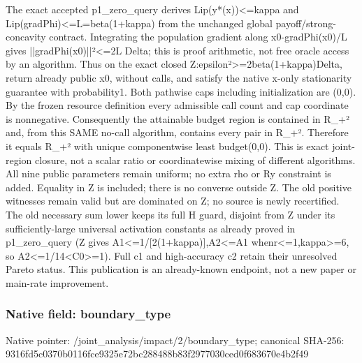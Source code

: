 \documentclass[10pt,a4paper]{article}
\begin{document}
\begingroup\raggedright\sloppy The exact accepted p1\_\allowbreak{}zero\_\allowbreak{}query derives Lip(y*(x))<=\allowbreak{}kappa and Lip(gradPhi)<=\allowbreak{}L=\allowbreak{}beta(1+kappa) from the unchanged global payoff/\allowbreak{}strong-concavity contract. Integrating the population gradient along x0-gradPhi(x0)/\allowbreak{}L gives ||gradPhi(x0)||{\AtlasUnicodeText ²}\allowbreak{}<=\allowbreak{}2L Delta;\allowbreak{} this is proof arithmetic,\allowbreak{} not free oracle access by an algorithm. Thus on the exact closed Z:\allowbreak{}epsilon{\AtlasUnicodeText ²}\allowbreak{}>=\allowbreak{}2beta(1+kappa)Delta,\allowbreak{} return already public x0,\allowbreak{} without calls,\allowbreak{} and satisfy the native x-only stationarity guarantee with probability1. Both pathwise caps including initialization are (0,\allowbreak{}0). By the frozen resource definition every admissible call count and cap coordinate is nonnegative. Consequently the attainable budget region is contained in R\_\allowbreak{}+{\AtlasUnicodeText ²}\allowbreak{} and,\allowbreak{} from this SAME no-call algorithm,\allowbreak{} contains every pair in R\_\allowbreak{}+{\AtlasUnicodeText ²}\allowbreak{}. Therefore it equals R\_\allowbreak{}+{\AtlasUnicodeText ²}\allowbreak{} with unique componentwise least budget(0,\allowbreak{}0). This is exact joint-region closure,\allowbreak{} not a scalar ratio or coordinatewise mixing of different algorithms. All nine public parameters remain uniform;\allowbreak{} no extra rho or Ry constraint is added. Equality in Z is included;\allowbreak{} there is no converse outside Z. The old positive witnesses remain valid but are dominated on Z;\allowbreak{} no source is newly recertified. The old necessary sum lower keeps its full H guard,\allowbreak{} disjoint from Z under its sufficiently-large universal activation constants as already proved in p1\_\allowbreak{}zero\_\allowbreak{}query (Z gives A1<=\allowbreak{}1/\allowbreak{}[2(1+kappa)],\allowbreak{}A2<=\allowbreak{}A1 whenr<=\allowbreak{}1,\allowbreak{}kappa>=\allowbreak{}6,\allowbreak{} so A2<=\allowbreak{}1/\allowbreak{}14<C0>=\allowbreak{}1). Full c1 and high-accuracy c2 retain their unresolved Pareto status. This publication is an already-known endpoint,\allowbreak{} not a new paper or main-rate improvement.\par\endgroup

\subsubsection{Native field: boundary\_\allowbreak{}type}
Native pointer: /joint\_\allowbreak{}analysis/impact/2/boundary\_\allowbreak{}type; canonical SHA-256: 9316fd5c0370b0116fce9325e72bc288488b83f2977030ced0f683670e4b2f49
\end{document}

